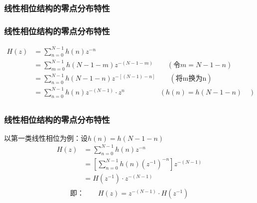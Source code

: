 \documentclass[notheorems,compress,mathserif,table]{beamer}
\begin{document}
\subsubsection{线性相位结构的零点分布特性}
\begin{frame}[shrink]\frametitle{线性相位结构的零点分布特性}%
\begin{equation*}
\begin{split}
H(z) &= \sum_{n=0}^{N-1}h(n)z^{-n} \\
     &= \sum_{m=0}^{N-1}h(N-1-m)z^{-(N-1-m)} \quad\quad(\mbox{令$m=N-1-n$}) \\
     &= \sum_{n=0}^{N-1}h(N-1-n)z^{-[(N-1)-n]} \quad\quad(\mbox{将m换为n})\\
     &= \sum_{n=0}^{N-1}h(n)z^{-(N-1)}\cdot z^{n}\quad\quad\quad\quad\quad  ( h(n) = h(N-1-n)\quad)\\
\end{split}
\end{equation*}
\end{frame}
\begin{frame}\frametitle{线性相位结构的零点分布特性}%
以第一类线性相位为例：设$h(n) = h(N-1-n)$
\begin{equation*}
\begin{split}
H(z) &= \sum_{n=0}^{N-1}h(n)z^{-n} \\
     &= \left[\sum_{n=0}^{N-1}h(n)(z^{-1})^{-n}\right]z^{-(N-1)}\\
     &= H(z^{-1})\cdot z^{-(N-1)}\\
\end{split}
\end{equation*}
$$\mbox{即：}\quad\quad H(z) = z^{-(N-1)}\cdot H(z^{-1})$$

\end{frame}
\end{document}
